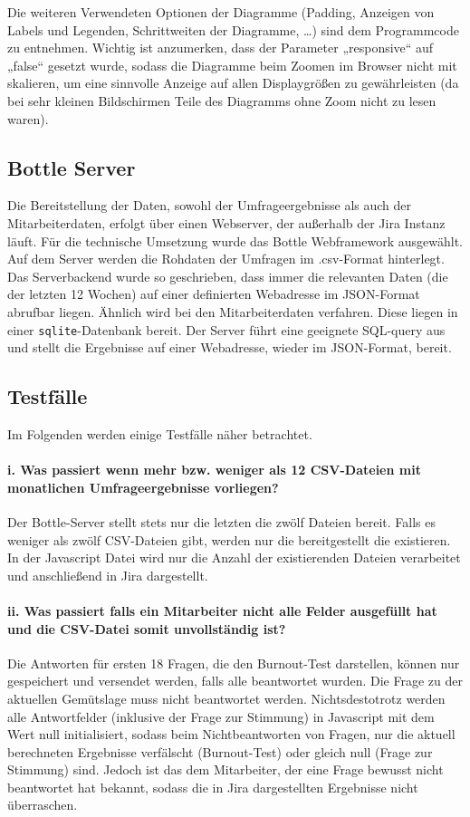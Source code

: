 \documentclass[a4paper,12pt,]{article}
\begin{document}
Die weiteren Verwendeten Optionen der Diagramme (Padding, Anzeigen von Labels und Legenden, Schrittweiten der Diagramme, …) sind dem Programmcode zu entnehmen.
Wichtig ist anzumerken, dass der Parameter „responsive“ auf „false“ gesetzt wurde, sodass die Diagramme beim Zoomen im Browser nicht mit skalieren, um eine sinnvolle Anzeige auf allen Displaygrößen zu gewährleisten (da bei sehr kleinen Bildschirmen Teile des Diagramms ohne Zoom nicht zu lesen waren).

\subsection{Bottle Server}
Die Bereitstellung der Daten, sowohl der Umfrageergebnisse als auch der Mitarbeiterdaten, erfolgt über einen Webserver, der außerhalb der Jira Instanz läuft. Für die technische Umsetzung wurde das Bottle Webframework ausgewählt. Auf dem Server werden die Rohdaten der Umfragen im .csv-Format hinterlegt. Das Serverbackend wurde so geschrieben, dass immer die relevanten Daten (die der letzten 12 Wochen) auf einer definierten Webadresse im JSON-Format abrufbar liegen. Ähnlich wird bei den Mitarbeiterdaten verfahren. Diese liegen in einer \texttt{sqlite}-Datenbank bereit. Der Server führt eine geeignete SQL-query aus und stellt die Ergebnisse auf einer Webadresse, wieder im JSON-Format, bereit.

\subsection{Testfälle}
Im Folgenden werden einige Testfälle näher betrachtet.

\paragraph{
i. Was passiert wenn mehr bzw. weniger als 12 CSV-Dateien mit monatlichen Umfrageergebnisse vorliegen?}
Der Bottle-Server stellt stets nur die letzten die zwölf Dateien bereit. Falls es weniger als zwölf CSV-Dateien gibt, werden nur die bereitgestellt die existieren. In der Javascript Datei wird nur die Anzahl der existierenden Dateien verarbeitet und anschließend in Jira dargestellt.

\paragraph{
ii. Was passiert falls ein Mitarbeiter nicht alle Felder ausgefüllt hat und die CSV-Datei somit unvollständig ist?}
Die Antworten für ersten 18 Fragen, die den Burnout-Test darstellen, können nur gespeichert und versendet werden, falls alle beantwortet wurden. Die Frage zu der aktuellen Gemütslage muss nicht beantwortet werden. Nichtsdestotrotz werden alle Antwortfelder (inklusive der Frage zur Stimmung) in Javascript mit dem Wert null initialisiert, sodass beim Nichtbeantworten von Fragen, nur die aktuell berechneten Ergebnisse verfälscht (Burnout-Test) oder gleich null (Frage zur Stimmung) sind. Jedoch ist das dem Mitarbeiter, der eine Frage bewusst nicht beantwortet hat bekannt, sodass die in Jira dargestellten Ergebnisse nicht überraschen.
\end{document}
